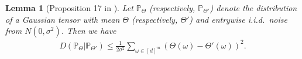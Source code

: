 \documentclass[12pt]{article}
\newtheorem{lem}{Lemma}
\theoremstyle{definition}
\begin{document}
\begin{lem} [Proposition 17 in \citet{gao2016optimal}]\label{prop:kl} Let $\mathbb{P}_{\Theta}$ (respectively, $\mathbb{P}_{\Theta'}$) denote the distribution of a Gaussian tensor with mean $\Theta$ (respectively, $\Theta'$) and entrywise i.i.d.\ noise from $N(0,\sigma^2)$. Then we have
\begin{align}
    D(\mathbb{P}_\Theta|\mathbb{P}_{\Theta'})\leq \frac{1}{2\sigma^2}\sum_{\omega\in[d]^m}(\Theta(\omega)-\Theta'(\omega))^2.
\end{align}
\end{lem}

 
\end{document}
